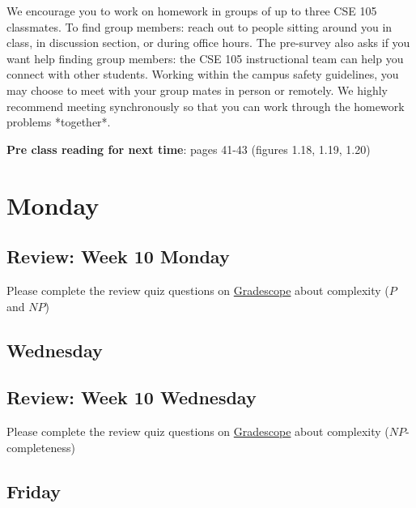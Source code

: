We encourage you to work on homework in groups of up to three CSE 105 classmates. 
To find group members: reach out to people sitting around you in class, in discussion section, 
or during office hours. The pre-survey also asks if you want help finding group members: 
the CSE 105 instructional team can help you connect with other students. Working within the 
campus safety guidelines, you may choose to meet with your group mates in person or remotely. 
We highly recommend meeting synchronously so that you can work through the homework problems *together*. 

{\bf Pre class reading for next time}: pages 41-43 (figures 1.18, 1.19, 1.20)

\newpage

\section*{Monday}



\subsection*{Review: Week 10 Monday}

Please complete the review quiz questions on \href{http://gradescope.com}{Gradescope} about 
complexity ($P$ and $NP$)


\newpage
\subsection*{Wednesday}



\subsection*{Review: Week 10 Wednesday}

Please complete the review quiz questions on \href{http://gradescope.com}{Gradescope} about 
complexity ($NP$-completeness)

\newpage
\subsection*{Friday}



\newpage


\vfill

